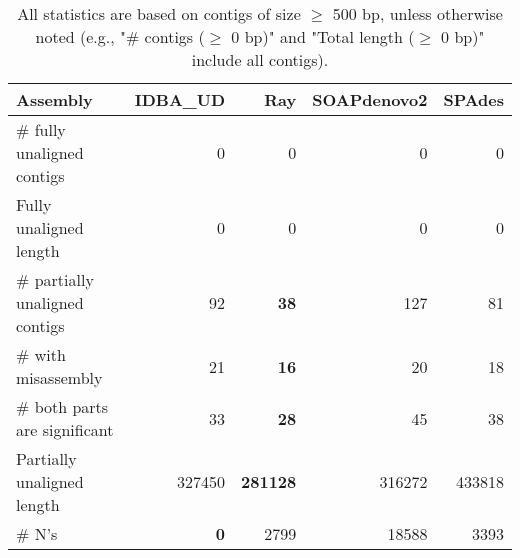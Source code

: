 \documentclass[12pt,a4paper]{article}
\begin{document}
\begin{table}[ht]
\begin{center}
\caption{All statistics are based on contigs of size $\geq$ 500 bp, unless otherwise noted (e.g., "\# contigs ($\geq$ 0 bp)" and "Total length ($\geq$ 0 bp)" include all contigs).}
\begin{tabular}{|l*{4}{|r}|}
\hline
Assembly & IDBA\_UD & Ray & SOAPdenovo2 & SPAdes \\ \hline
\# fully unaligned contigs & 0 & 0 & 0 & 0 \\ \hline
Fully unaligned length & 0 & 0 & 0 & 0 \\ \hline
\# partially unaligned contigs & 92 & {\bf 38} & 127 & 81 \\ \hline
\hspace{5mm}\# with misassembly & 21 & {\bf 16} & 20 & 18 \\ \hline
\hspace{5mm}\# both parts are significant & 33 & {\bf 28} & 45 & 38 \\ \hline
Partially unaligned length & 327450 & {\bf 281128} & 316272 & 433818 \\ \hline
\# N's & {\bf 0} & 2799 & 18588 & 3393 \\ \hline
\end{tabular}
\end{center}
\end{table}
\end{document}
